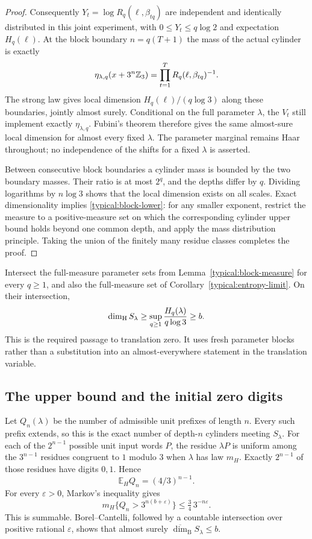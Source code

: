 \begin{proof}
Consequently $Y_t=\log R_q(\ell,\beta_{tq})$ are independent and
identically distributed in this joint experiment, with
$0\le Y_t\le q\log2$ and expectation $H_q(\ell)$. At the block
boundary $n=q(T+1)$ the mass of the actual cylinder is exactly
\[
 \eta_{\lambda,q}(x+3^n\mathbb Z_3)
       =\prod_{t=1}^T R_q(\ell,\beta_{tq})^{-1}.
\]
The strong law gives local dimension $H_q(\ell)/(q\log3)$ along
these boundaries, jointly almost surely. Conditional on the full
parameter $\lambda$, the $V_t$ still implement exactly
$\eta_{\lambda,q}$. Fubini's theorem therefore gives the same
almost-sure local dimension for almost every fixed $\lambda$.
The parameter marginal remains Haar throughout; no independence
of the shifts for a fixed $\lambda$ is asserted.

Between consecutive block boundaries a cylinder mass is bounded
by the two boundary masses. Their ratio is at most $2^q$, and the
depths differ by $q$. Dividing logarithms by $n\log3$ shows that
the local dimension exists on all scales. Exact dimensionality
implies \eqref{typical:block-lower}: for any smaller exponent,
restrict the measure to a positive-measure set on which the
corresponding cylinder upper bound holds beyond one common depth,
and apply the mass distribution principle. Taking the union of the
finitely many residue classes completes the proof.
\end{proof}

Intersect the full-measure parameter sets from
Lemma~\ref{typical:block-measure} for every $q\ge1$, and also the
full-measure set of Corollary~\ref{typical:entropy-limit}. On their
intersection,
\begin{equation}\label{typical:hausdorff-lower}
 \dim_{\mathrm H} S_\lambda\ge
 \sup_{q\ge1}\frac{H_q(\lambda)}{q\log3}\ge b.
\end{equation}
This is the required passage to translation zero. It uses fresh
parameter blocks rather than a substitution into an almost-everywhere
statement in the translation variable.

\subsection{The upper bound and the initial zero digits}

Let $Q_n(\lambda)$ be the number of admissible unit prefixes of
length $n$. Every such prefix extends, so this is the exact number
of depth-$n$ cylinders meeting $S_\lambda$. For each of the
$2^{n-1}$ possible unit input words $P$, the residue $\lambda P$
is uniform among the $3^{n-1}$ residues congruent to $1$ modulo $3$
when $\lambda$ has law $m_H$. Exactly $2^{n-1}$ of those residues
have digits $0,1$. Hence
\begin{equation}\label{typical:unit-first-moment}
 \mathbb E_H Q_n=(4/3)^{n-1}.
\end{equation}
For every $\varepsilon>0$, Markov's inequality gives
\[
 m_H\{Q_n>3^{n(b+\varepsilon)}\}
     \le\tfrac34\,3^{-n\varepsilon}.
\]
This is summable. Borel--Cantelli, followed by a countable
intersection over positive rational $\varepsilon$, shows that
almost surely $\overline{\dim}_{\mathrm B}S_\lambda\le b$.

